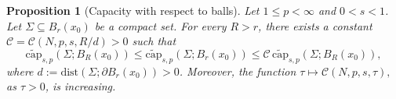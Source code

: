 \documentclass[10pt,a4paper]{amsart}
\newtheorem{proposition}{Proposition}
\begin{document}
\begin{proposition}[Capacity with respect to balls] \label{prop:cap-wrt-balls}
	Let $1 \le p < \infty$ and $0 < s < 1$. Let $\Sigma \subseteq B_r(x_0)$ be a compact set. For every $R > r$, there exists a constant $\mathscr{C} = \mathscr{C}(N, p, s, R/d) > 0$ such that  
	\begin{equation} \label{capacity-wrt-balls}
		\widetilde{\mathrm{cap}}_{s,p}\left(\Sigma; B_R(x_0)\right) \leq \widetilde{\mathrm{cap}}_{s,p}\left(\Sigma; B_r(x_0)\right) \leq \mathscr{C}\,\widetilde{\mathrm{cap}}_{s,p}\left(\Sigma; B_R(x_0)\right),
	\end{equation}
	where $d := \mathrm{dist}(\Sigma; \partial B_r(x_0)) > 0$. Moreover, the function $\tau \mapsto \mathscr{C}(N, p, s, \tau),$ as $\tau > 0$, is increasing. 
\end{proposition} 
\end{document}
